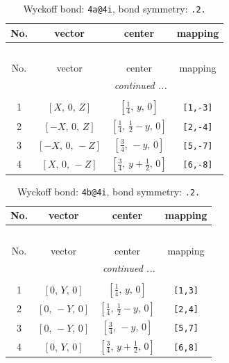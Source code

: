 \documentclass[fleqn,8pt]{jsarticle}
\begin{document}
\begin{longtable}{cccc}
\caption{Wyckoff bond: {\tt 4a@4i}, bond symmetry: {\tt .2.}}
 \\
 \hline \hline
No. & vector & center & mapping \\ \hline \endfirsthead

\multicolumn{3}{l}{\tablename\ \thetable{}} \\
 \hline \hline
No. & vector & center & mapping \\ \hline \endhead

 \hline \hline
\multicolumn{3}{r}{\footnotesize\it continued ...} \\ \endfoot

 \hline \hline
\multicolumn{3}{r}{} \\ \endlastfoot

1 & $\left[ X,\, 0,\, Z \right]$ & $\left[ \frac{1}{4},\, y,\, 0 \right]$ & {\tt [1,-3]} \\ \hline
2 & $\left[ - X,\, 0,\, Z \right]$ & $\left[ \frac{1}{4},\, \frac{1}{2} - y,\, 0 \right]$ & {\tt [2,-4]} \\ \hline
3 & $\left[ - X,\, 0,\, - Z \right]$ & $\left[ \frac{3}{4},\, - y,\, 0 \right]$ & {\tt [5,-7]} \\ \hline
4 & $\left[ X,\, 0,\, - Z \right]$ & $\left[ \frac{3}{4},\, y + \frac{1}{2},\, 0 \right]$ & {\tt [6,-8]} \\
\end{longtable}
\renewcommand{\arraystretch}{1.2}
\begin{longtable}{cccc}
\caption{Wyckoff bond: {\tt 4b@4i}, bond symmetry: {\tt .2.}}
 \\
 \hline \hline
No. & vector & center & mapping \\ \hline \endfirsthead

\multicolumn{3}{l}{\tablename\ \thetable{}} \\
 \hline \hline
No. & vector & center & mapping \\ \hline \endhead

 \hline \hline
\multicolumn{3}{r}{\footnotesize\it continued ...} \\ \endfoot

 \hline \hline
\multicolumn{3}{r}{} \\ \endlastfoot

1 & $\left[ 0,\, Y,\, 0 \right]$ & $\left[ \frac{1}{4},\, y,\, 0 \right]$ & {\tt [1,3]} \\ \hline
2 & $\left[ 0,\, - Y,\, 0 \right]$ & $\left[ \frac{1}{4},\, \frac{1}{2} - y,\, 0 \right]$ & {\tt [2,4]} \\ \hline
3 & $\left[ 0,\, - Y,\, 0 \right]$ & $\left[ \frac{3}{4},\, - y,\, 0 \right]$ & {\tt [5,7]} \\ \hline
4 & $\left[ 0,\, Y,\, 0 \right]$ & $\left[ \frac{3}{4},\, y + \frac{1}{2},\, 0 \right]$ & {\tt [6,8]} \\
\end{longtable}
\end{document}
